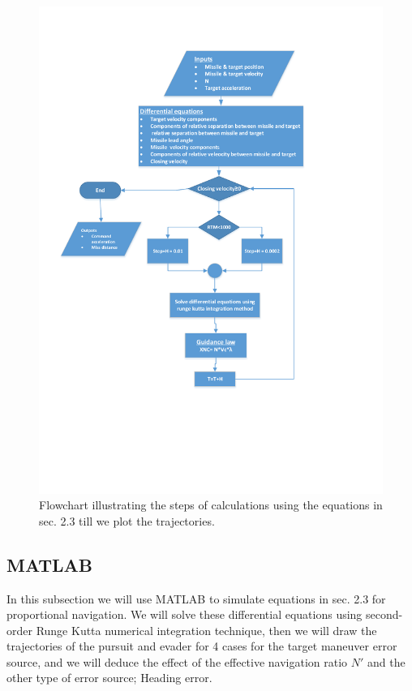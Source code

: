 \begin{figure}[htb]
	\centering
	\includegraphics[scale = 0.85]{fig/FlowchartPN.pdf}
	\caption{Flowchart illustrating the steps of calculations using the equations in sec. 2.3  till we plot the trajectories.}
	\label{flowchart PN}
\end{figure}


\subsection{MATLAB}
In this subsection we will use MATLAB to simulate equations in sec. 2.3 for proportional navigation. We will solve these differential equations using second-order Runge Kutta numerical integration technique, then we will draw the trajectories of the pursuit and evader for 4 cases for the target maneuver error source, and we will deduce the effect of the effective navigation ratio $N'$ and the other type of error source; Heading error. 
